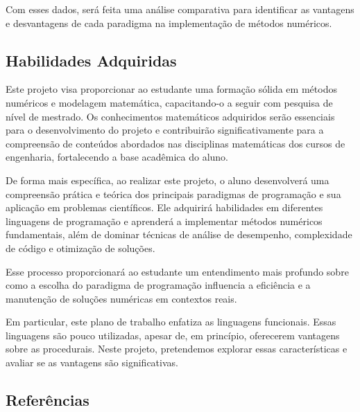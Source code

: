 Com esses dados, será feita uma análise comparativa para identificar as
vantagens e desvantagens de cada paradigma na implementação de métodos
numéricos.

\subsection*{Habilidades Adquiridas}

Este projeto visa proporcionar ao estudante uma formação sólida em métodos
numéricos e modelagem matemática, capacitando-o a seguir com pesquisa de nível
de mestrado. Os conhecimentos matemáticos adquiridos serão essenciais para o
desenvolvimento do projeto e contribuirão significativamente para a compreensão
de conteúdos abordados nas disciplinas matemáticas dos cursos de engenharia,
fortalecendo a base acadêmica do aluno.

De forma mais específica, ao realizar este projeto, o aluno desenvolverá uma
compreensão prática e teórica dos principais paradigmas de programação e sua
aplicação em problemas científicos. Ele adquirirá habilidades em diferentes
linguagens de programação e aprenderá a implementar métodos numéricos
fundamentais, além de dominar técnicas de análise de desempenho, complexidade
de código e otimização de soluções.

Esse processo proporcionará ao estudante um entendimento mais profundo sobre
como a escolha do paradigma de programação influencia a eficiência e a
manutenção de soluções numéricas em contextos reais.

Em particular, este plano de trabalho enfatiza as linguagens funcionais. Essas
linguagens são pouco utilizadas, apesar de, em princípio, oferecerem vantagens
sobre as procedurais. Neste projeto, pretendemos explorar essas características
e avaliar se as vantagens são significativas.

\subsection*{Referências}

